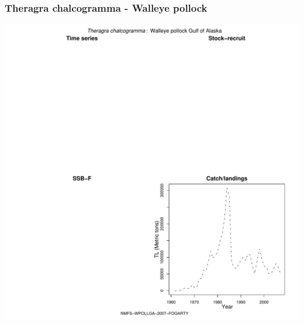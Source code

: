 \subsubsection{Theragra chalcogramma - Walleye pollock}
\begin{center}
\includegraphics[width=1.2\textwidth]{../R/figures/NMFS-WPOLLGA-2007-FOGARTY.pdf}
\end{center}

